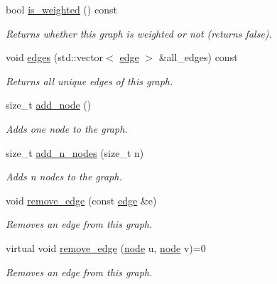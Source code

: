 \begin{DoxyCompactItemize}
\mbox{\label{classlgraph_1_1uxgraph_a8fab8e739e0e74852a1c6de18b2fe6aa}} 
bool \hyperlink{classlgraph_1_1uxgraph_a8fab8e739e0e74852a1c6de18b2fe6aa}{is\+\_\+weighted} () const
\begin{DoxyCompactList}\small\item\em Returns whether this graph is weighted or not (returns false). \end{DoxyCompactList}\item 
void \hyperlink{classlgraph_1_1uxgraph_abf4c5ce2b595780e6ba80f06bdd0be16}{edges} (std\+::vector$<$ \hyperlink{namespacelgraph_a76bd7d50719f03de7a85db259d80d572}{edge} $>$ \&all\+\_\+edges) const
\begin{DoxyCompactList}\small\item\em Returns all unique edges of this graph. \end{DoxyCompactList}\item 
size\+\_\+t \hyperlink{classlgraph_1_1xxgraph_a6cb21d5e52afbb438a3e6643998c40cf}{add\+\_\+node} ()
\begin{DoxyCompactList}\small\item\em Adds one node to the graph. \end{DoxyCompactList}\item 
size\+\_\+t \hyperlink{classlgraph_1_1xxgraph_a8dd24aa48d55dfceaa87e47c32ae914a}{add\+\_\+n\+\_\+nodes} (size\+\_\+t n)
\begin{DoxyCompactList}\small\item\em Adds {\itshape n} nodes to the graph. \end{DoxyCompactList}\item 
void \hyperlink{classlgraph_1_1xxgraph_a46a75fa2a10a8674ab930e9dc766e2f9}{remove\+\_\+edge} (const \hyperlink{namespacelgraph_a76bd7d50719f03de7a85db259d80d572}{edge} \&e)
\begin{DoxyCompactList}\small\item\em Removes an edge from this graph. \end{DoxyCompactList}\item 
virtual void \hyperlink{classlgraph_1_1xxgraph_a7fd3a1309cde4f408c8d9d4cb3b898a8}{remove\+\_\+edge} (\hyperlink{namespacelgraph_a397169dd66adf725210a30fb7251773e}{node} u, \hyperlink{namespacelgraph_a397169dd66adf725210a30fb7251773e}{node} v)=0
\begin{DoxyCompactList}\small\item\em Removes an edge from this graph. \end{DoxyCompactList}\item 

\end{DoxyCompactItemize}
